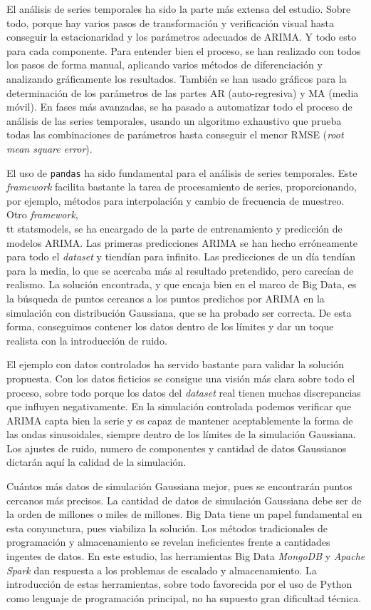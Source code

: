 \documentclass[11pt,spanish,listoffigures,listoftables]{tfgetsinf}
\begin{document}
El análisis de series temporales ha sido la parte más extensa del estudio. Sobre todo, porque hay varios pasos de transformación y verificación visual hasta conseguir la estacionaridad y los parámetros adecuados de ARIMA. Y todo esto para cada componente. Para entender bien el proceso, se han realizado con todos los pasos de forma manual, aplicando varios métodos de diferenciación y analizando gráficamente los resultados. También se han usado gráficos para la determinación de los parámetros de las partes AR (auto-regresiva) y MA (media móvil). En fases más avanzadas, se ha pasado a automatizar todo el proceso de análisis de las series temporales, usando un algoritmo exhaustivo que prueba todas las combinaciones de parámetros hasta conseguir el menor RMSE ({\em root mean square error}).

El uso de {\tt pandas} ha sido fundamental para el análisis de series temporales. Este {\em framework} facilita bastante la tarea de procesamiento de series, proporcionando, por ejemplo, métodos para interpolación y cambio de frecuencia de muestreo. Otro {\em framework}, {\\tt statsmodels}, se ha encargado de la parte de entrenamiento y predicción de modelos ARIMA. Las primeras predicciones ARIMA se han hecho erróneamente para todo el {\em dataset} y tiendían para infinito. Las predicciones de un día tendían para la media, lo que se acercaba más al resultado pretendido, pero carecían de realismo. La solución encontrada, y que encaja bien en el marco de Big Data, es la búsqueda de puntos cercanos a los puntos predichos por ARIMA en la simulación con distribución Gaussiana, que se ha probado ser correcta. De esta forma, conseguimos contener los datos dentro de los límites y dar un toque realista con la introducción de ruido.

El ejemplo con datos controlados ha servido bastante para validar la solución propuesta. Con los datos ficticios se consigue una visión más clara sobre todo el proceso, sobre todo porque los datos del {\em dataset} real tienen muchas discrepancias que influyen negativamente. En la simulación controlada podemos verificar que ARIMA capta bien la serie y es capaz de mantener aceptablemente la forma de las ondas sinusoidales, siempre dentro de los límites de la simulación Gaussiana. Los ajustes de ruido, numero de componentes y cantidad de datos Gaussianos dictarán aquí la calidad de la simulación.

Cuántos más datos de simulación Gaussiana mejor, pues se encontrarán puntos cercanos más precisos. La cantidad de datos de simulación Gaussiana debe ser de la orden de millones o miles de millones. Big Data tiene un papel fundamental en esta conyunctura, pues viabiliza la solución. Los métodos tradicionales de programación y almacenamiento se revelan ineficientes frente a cantidades ingentes de datos. En este estudio, las herramientas Big Data {\em MongoDB} y {\em Apache Spark} dan respuesta a los problemas de escalado y almacenamiento. La introducción de estas herramientas, sobre todo favorecida por el uso de Python como lenguaje de programación principal, no ha supuesto gran dificultad técnica.
\end{document}
